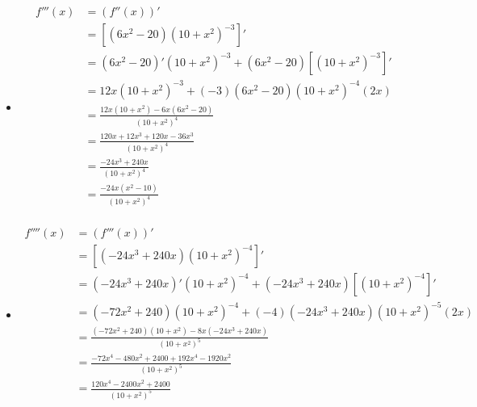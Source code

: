 \documentclass[12pt]{article}
\begin{document}
\begin{itemize}
    \item
    \begin{align*}
        f'''(x) &= \left(f''(x) \right)'\\
        &= \left[\left(6x^2- 20 \right) \left(10+ x^2 \right)^{-3} \right]'\\
        &= \left(6x^2- 20 \right)'\left(10+x^2 \right)^{-3}
        + \left(6x^2- 20 \right) \left[\left(10+x^2 \right)^{-3} \right]'\\
        &= 12x \left(10+x^2 \right)^{-3}+ \left(-3 \right)\left(6x^2- 20 \right) \left(10+x^2 \right)^{-4} \left(2x \right)\\
        &= \frac{12x \left(10+ x^2 \right)- 6x\left(6x^2- 20 \right)}{\left(10+x^2 \right)^4}\\
        &= \frac{120x+ 12x^3+ 120x- 36x^3}{\left(10+x^2 \right)^4}\\
        &= \frac{-24x^3+ 240x}{\left(10+x^2 \right)^4}\\
        &= \frac{-24x\left(x^2- 10 \right)}{\left(10+x^2 \right)^4}\\
    \end{align*}
    
    
    
    \item
    \begin{align*}
        f''''(x) &= \left(f'''(x) \right)'\\
        &= \left[\left(-24x^3+ 240x \right) \left(10+ x^2 \right)^{-4} \right]'\\
        &= \left(-24x^3+ 240x \right)' \left(10+ x^2 \right)^{-4}+ \left(-24x^3+ 240x \right) \left[ \left(10+ x^2 \right)^{-4} \right]'\\
        &= \left(-72x^2+ 240 \right) \left(10+ x^2 \right)^{-4}+ \left(-4 \right) \left(-24x^3+ 240x \right) \left(10+ x^2 \right)^{-5} \left(2x \right)\\
        &= \frac{\left(-72x^2+ 240 \right) \left(10+ x^2 \right)- 8x\left(-24x^3+ 240x \right)}{\left(10+ x^2 \right)^5}\\
        &= \frac{-72x^4- 480x^2+ 2400+ 192x^4- 1920x^2}{\left(10+ x^2 \right)^5}\\
        &= \frac{120x^4- 2400x^2+ 2400}{\left(10+ x^2 \right)^5}\\
    \end{align*}
    
    
 \end{itemize}
\end{document}
